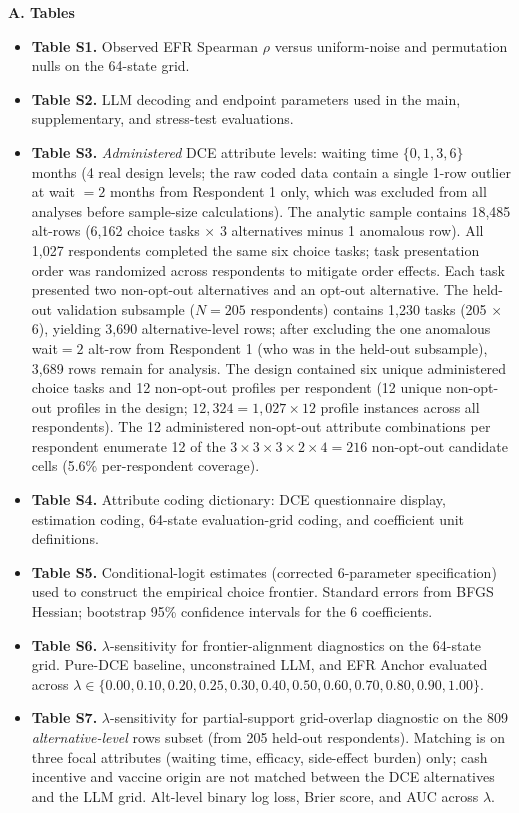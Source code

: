 \documentclass[12pt]{article}
\begin{document}
\textbf{A. Tables}
\begin{itemize}\setlength{\itemsep}{0pt}
\item \textbf{Table S1.} Observed EFR Spearman $\rho$ versus uniform-noise and permutation nulls on the 64-state grid.
\item \textbf{Table S2.} LLM decoding and endpoint parameters used in the main, supplementary, and stress-test evaluations.
\item \textbf{Table S3.} \emph{Administered} DCE attribute levels: waiting time $\{0, 1, 3, 6\}$ months (4 real design levels; the raw coded data contain a single 1-row outlier at wait $= 2$ months from Respondent 1 only, which was excluded from all analyses before sample-size calculations). The analytic sample contains 18,485 alt-rows (6,162 choice tasks $\times$ 3 alternatives minus 1 anomalous row). All 1,027 respondents completed the same six choice tasks; task presentation order was randomized across respondents to mitigate order effects. Each task presented two non-opt-out alternatives and an opt-out alternative. The held-out validation subsample ($N=205$ respondents) contains 1,230 tasks (205 $\times$ 6), yielding 3,690 alternative-level rows; after excluding the one anomalous wait$=2$ alt-row from Respondent 1 (who was in the held-out subsample), 3,689 rows remain for analysis. The design contained six unique administered choice tasks and 12 non-opt-out profiles per respondent (12 unique non-opt-out profiles in the design; $12{,}324 = 1{,}027 \times 12$ profile instances across all respondents). The 12 administered non-opt-out attribute combinations per respondent enumerate 12 of the $3 \times 3 \times 3 \times 2 \times 4 = 216$ non-opt-out candidate cells (5.6\% per-respondent coverage).
\item \textbf{Table S4.} Attribute coding dictionary: DCE questionnaire display, estimation coding, 64-state evaluation-grid coding, and coefficient unit definitions.
\item \textbf{Table S5.} Conditional-logit estimates (corrected 6-parameter specification) used to construct the empirical choice frontier. Standard errors from BFGS Hessian; bootstrap 95\% confidence intervals for the 6 coefficients.
\item \textbf{Table S6.} $\lambda$-sensitivity for frontier-alignment diagnostics on the 64-state grid. Pure-DCE baseline, unconstrained LLM, and EFR Anchor evaluated across $\lambda \in \{0.00, 0.10, 0.20, 0.25, 0.30, 0.40, 0.50, 0.60, 0.70, 0.80, 0.90, 1.00\}$.
\item \textbf{Table S7.} $\lambda$-sensitivity for partial-support grid-overlap diagnostic on the 809 \emph{alternative-level} rows subset (from 205 held-out respondents). Matching is on three focal attributes (waiting time, efficacy, side-effect burden) only; cash incentive and vaccine origin are not matched between the DCE alternatives and the LLM grid. Alt-level binary log loss, Brier score, and AUC across $\lambda$.

\end{itemize}
\end{document}

